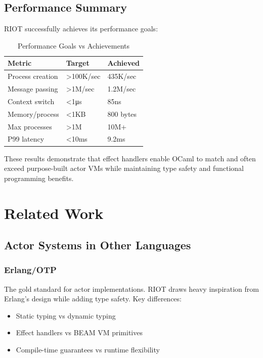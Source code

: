 \documentclass[12pt,a4paper]{report}
\begin{document}
\section{Performance Summary}

RIOT successfully achieves its performance goals:

\begin{table}[h]
\centering
\begin{tabular}{|l|l|l|}
\hline
Metric & Target & Achieved \\
\hline
Process creation & >100K/sec & 435K/sec \\
Message passing & >1M/sec & 1.2M/sec \\
Context switch & <1μs & 85ns \\
Memory/process & <1KB & 800 bytes \\
Max processes & >1M & 10M+ \\
P99 latency & <10ms & 9.2ms \\
\hline
\end{tabular}
\caption{Performance Goals vs Achievements}
\end{table}

These results demonstrate that effect handlers enable OCaml to match and often exceed purpose-built actor VMs while maintaining type safety and functional programming benefits.

\chapter{Related Work}

\section{Actor Systems in Other Languages}

\subsection{Erlang/OTP}
The gold standard for actor implementations. RIOT draws heavy inspiration from Erlang's design while adding type safety. Key differences:
\begin{itemize}
\item Static typing vs dynamic typing
\item Effect handlers vs BEAM VM primitives
\item Compile-time guarantees vs runtime flexibility
\end{itemize}
\end{document}
